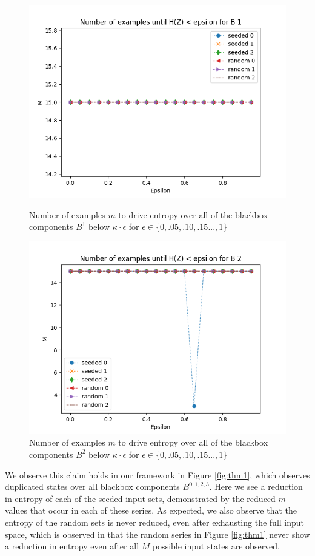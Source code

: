 \documentclass[letterpaper,twocolumn,10pt]{article}
\begin{document}
\begin{figure}
\includegraphics[width=\linewidth]{figs/seeded_1.png}
\caption{\label{fig:b1} Number of examples $m$ to drive entropy over all of the blackbox components $B^{1}$ below $\kappa \cdot \epsilon$ for $\epsilon \in \{0, .05, .10, .15...,1\}$}

\includegraphics[width=\linewidth]{figs/seeded_2.png}
\caption{\label{fig:b2} Number of examples $m$ to drive entropy over all of the blackbox components $B^{2}$ below $\kappa \cdot \epsilon$ for $\epsilon \in \{0, .05, .10, .15...,1\}$}
\end{figure} 

We observe this claim holds in our framework in Figure \ref{fig:thm1}, which observes duplicated states over all blackbox components $B^{0,1,2,3}$. Here we see a reduction in entropy of each of the seeded input sets, demonstrated by the reduced $m$ values that occur in each of these series. As expected, we also observe that the entropy of the random sets is never reduced, even after exhausting the full input space, which is observed in that the random series in Figure \ref{fig:thm1} never show a reduction in entropy even after all $M$ possible input states are observed. 
\end{document}
